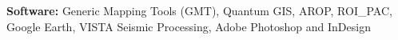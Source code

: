 

\vspace{5pt}

\textbf{Software:} Generic Mapping Tools (GMT), Quantum GIS, AROP, ROI\_PAC, Google Earth, VISTA Seismic Processing, Adobe Photoshop and InDesign
